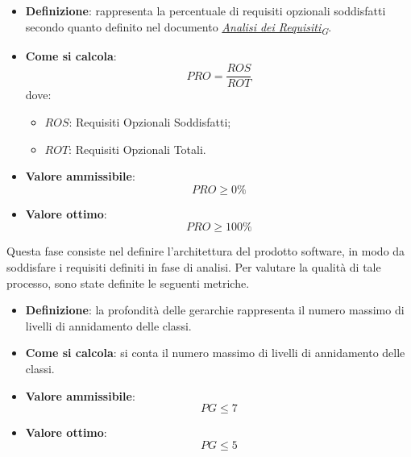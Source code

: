 \hypertarget{13M}{}
\begin{itemize}
	\item \textbf{Definizione}: rappresenta la percentuale di requisiti opzionali soddisfatti secondo quanto definito nel documento \href{https://7last.github.io/docs/rtb/documentazione-interna/glossario\#analisi-dei-requisiti}{\textit{Analisi dei Requisiti\textsubscript{G}}}.
	\item \textbf{Come si calcola}: \begin{equation*}PRO = \frac{ROS}{ROT}\end{equation*} dove:
		\begin{itemize}
			\item $ROS$: Requisiti Opzionali Soddisfatti;
			\item $ROT$: Requisiti Opzionali Totali.
		\end{itemize}
	\item \textbf{Valore ammissibile}: \begin{equation*}PRO \geq 0\%\end{equation*}
	\item \textbf{Valore ottimo}: \begin{equation*}PRO \geq 100\%\end{equation*}
\end{itemize}

Questa fase consiste nel definire l'architettura del prodotto software, in modo da soddisfare i requisiti definiti in fase di analisi. Per valutare la qualità di tale processo, sono state definite le seguenti metriche.
\hypertarget{14M}{}
\begin{itemize}
	\item \textbf{Definizione}: la profondità delle gerarchie rappresenta il numero massimo di livelli di annidamento delle classi.
	\item \textbf{Come si calcola}: si conta il numero massimo di livelli di annidamento delle classi.
	\item \textbf{Valore ammissibile}: \begin{equation*}PG \leq 7\end{equation*}
	\item \textbf{Valore ottimo}: \begin{equation*}PG \leq 5\end{equation*}
\end{itemize}

